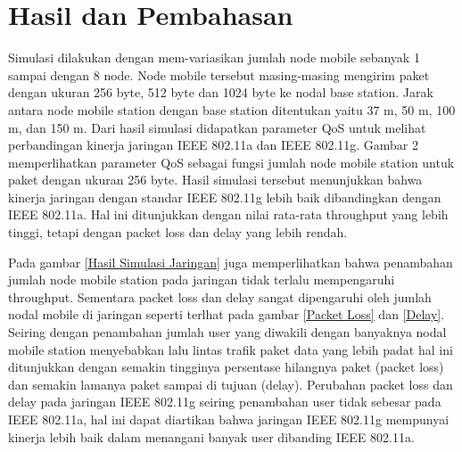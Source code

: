 \documentclass{jtetiproposalskripsi}
\begin{document}
\section{Hasil dan Pembahasan}
Simulasi dilakukan dengan mem-variasikan jumlah node mobile sebanyak 1 sampai dengan 8 node. Node mobile tersebut masing-masing mengirim paket dengan ukuran 256 byte, 512 byte dan 1024 byte ke nodal base station. Jarak antara node mobile station dengan base station ditentukan yaitu 37 m, 50 m, 100 m, dan 150 m. Dari hasil simulasi didapatkan parameter QoS untuk melihat perbandingan kinerja jaringan IEEE 802.11a dan IEEE 802.11g. Gambar 2 memperlihatkan parameter QoS sebagai fungsi jumlah node mobile station untuk paket dengan ukuran 256 byte. Hasil simulasi tersebut menunjukkan bahwa kinerja jaringan dengan standar IEEE 802.11g lebih baik dibandingkan dengan IEEE 802.11a. Hal ini ditunjukkan dengan nilai rata-rata throughput yang lebih tinggi, tetapi dengan packet loss dan delay yang lebih rendah.

Pada gambar \ref{Hasil Simulasi Jaringan} juga memperlihatkan bahwa penambahan jumlah node mobile station pada jaringan tidak terlalu mempengaruhi throughput. Sementara packet loss dan delay sangat dipengaruhi oleh jumlah nodal mobile di jaringan seperti terlhat pada gambar \ref{Packet Loss} dan \ref{Delay}. Seiring dengan penambahan jumlah user yang diwakili dengan banyaknya nodal mobile station menyebabkan lalu lintas trafik paket data yang lebih padat hal ini ditunjukkan dengan semakin tingginya persentase hilangnya paket (packet loss) dan semakin lamanya paket sampai di tujuan (delay). Perubahan packet loss dan delay pada jaringan IEEE 802.11g seiring penambahan user tidak sebesar pada IEEE 802.11a, hal ini dapat diartikan bahwa jaringan IEEE 802.11g mempunyai kinerja lebih baik dalam menangani banyak user dibanding IEEE 802.11a.
\end{document}
